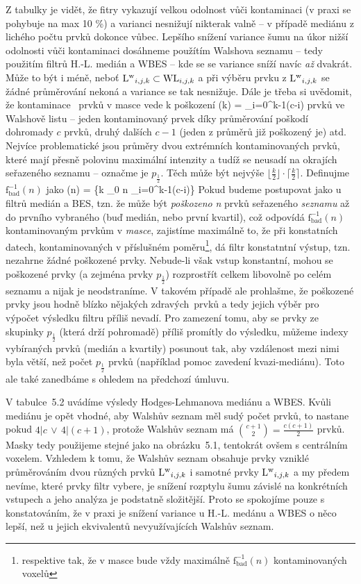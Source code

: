     Z tabulky je vidět, že fitry vykazují velkou odolnost vůči kontaminaci (v praxi se pohybuje na max 10 \%) a varianci nesnižují nikterak valně -- v případě mediánu z lichého počtu prvků dokonce vůbec. Lepšího snížení variance šumu na úkor nižší odolnosti vůči kontaminaci dosáhneme použítím Walshova seznamu -- tedy použitím filtrů H.-L. medián a WBES -- kde se se variance sníží navíc \emph{až} dvakrát. Může to být i méně, neboť ${\mathrm{L^w}_{i,j,k}} \subset {\mathrm{WL}_{i,j,k}}$ a při výběru prvku z ${\mathrm{L^w}_{i,j,k}}$ se žádné průměrování nekoná a variance se tak nesnižuje. Dále je třeba si uvědomit, že kontaminace \kk~prvků v masce vede k poškození
    \beq
    (k) = \sum_{i=0}^{k-1}(c-i)
    \eeq
    prvků ve Walshově listu -- jeden kontaminovaný prvek díky průměrování poškodí dohromady $c$ prvků, druhý dalších $c-1$ (jeden z průměrů již poškozený je) atd. Nejvíce problematické jsou průměry dvou extrémních kontaminovaných prvků, které mají přesně polovinu maximální intenzity a tudíž se neusadí na okrajích seřazeného seznamu -- označme je $p_{\frac{1}{2}}$. Těch může být nejvýše $\lfloor\frac{k}{2}\rfloor\cdot\lceil\frac{k}{2}\rceil$. Definujme $\mathrm{f_{bad}^{-1}}(n)$ jako
    \beq
    (n) = \max\bigg\{k \in \Nn_0 \;\bigg\vert\; n \geq \sum_{i=0}^{k-1}(c-i)\bigg\}
    \eeq
    Pokud budeme postupovat jako u filtrů medián a BES, tzn. že může být \emph{poškozeno} \textit{n} prvků seřazeného \emph{seznamu} až do prvního vybraného (buď medián, nebo první kvartil), což odpovídá $\mathrm{f_{bad}^{-1}}(n)$ kontaminovaným prvkům v \emph{masce}, zajistíme maximálně to, že při konstatních datech, kontaminovaných v příslušném poměru\footnote{respektive tak, že v masce bude vždy maximálně $\mathrm{f_{bad}^{-1}}(n)$ kontaminovaných voxelů}, dá filtr konstatntní výstup, tzn. nezahrne žádné poškozené prvky. Nebude-li však vstup konstantní, mohou se poškozené prvky (a zejména prvky $p_{\frac{1}{2}}$) rozprostřít celkem libovolně po celém seznamu a nijak je neodstraníme. V takovém případě ale prohlašme, že poškozené prvky jsou hodně blízko nějakých \bq zdravých\eq ~prvků a tedy jejich výběr pro výpočet výsledku filtru příliš nevadí. Pro zamezení tomu, aby se prvky ze skupinky $p_{\frac{1}{2}}$ (která drží pohromadě) příliš promítly do výsledku, můžeme indexy vybíraných prvků (medián a kvartily) posunout tak, aby vzdálenost mezi nimi byla větší, než počet $p_{\frac{1}{2}}$ prvků (například pomoc zavedení kvazi-mediánu). Toto ale také zanedbáme s ohledem na předchozí úmluvu.

    V tabulce~5.2 uvádíme výsledy Hodges-Lehmanova mediánu a WBES. Kvůli mediánu je opět vhodné, aby Walshův seznam měl sudý počet prvků, to nastane pokud $4|c \,\vee\, 4|(c+1)$, protože Walshův seznam má ${c+1 \choose 2} = \frac{c(c+1)}{2}$ prvků. Masky tedy použijeme stejné jako na obrázku~5.1, tentokrát ovšem s centrálním voxelem. Vzhledem k tomu, že Walshův seznam obsahuje prvky vzniklé průměrováním dvou různých prvků ${\mathrm{L^w}_{i,j,k}}$ i samotné prvky ${\mathrm{L^w}_{i,j,k}}$ a my předem nevíme, které prvky filtr vybere, je snížení rozptylu šumu závislé na konkrétních vstupech a jeho analýza je podstatně složitější. Proto se spokojíme pouze s konstatováním, že v praxi je snížení variance u H.-L. medánu a WBES o něco lepší, než u jejich ekvivalentů nevyužívajících Walshův seznam.

